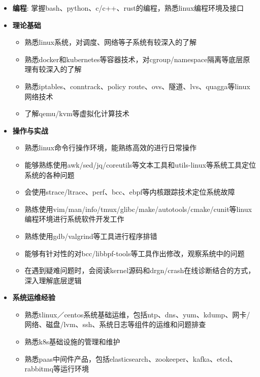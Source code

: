 \begin{itemize}[parsep=0.2ex]
  \item \textbf{编程}: 掌握bash、python、c/c++、rust的编程，熟悉linux编程环境及接口
  \item \textbf{理论基础}
    \begin{itemize}
      \item 熟悉linux系统，对调度、网络等子系统有较深入的了解
      \item 熟悉docker和kubernetes等容器技术，对cgroup/namespace隔离等底层原理有较深入的了解
      \item 熟悉iptables、conntrack、policy route、ovs、隧道、lvs、quagga等linux网络技术
      \item 了解qemu/kvm等虚拟化计算技术
    \end{itemize}
  \item \textbf{操作与实战}
    \begin{itemize}
      \item 熟悉linux命令行操作环境，能熟练高效的进行日常操作
      \item 能够熟练使用awk/sed/jq/coreutils等文本工具和utils-linux等系统工具定位系统的各种问题
      \item 会使用strace/ltrace、perf、bcc、ebpf等内核跟踪技术定位系统故障
      \item 熟练使用vim/man/info/tmux/glibc/make/autotools/cmake/cunit等linux编程环境进行系统软件开发工作
      \item 熟练使用gdb/valgrind等工具进行程序排错
      \item 能够有针对性的对bcc/libbpf-tools等工具作出修改，观察系统中的问题
      \item 在遇到疑难问题时，会阅读kernel源码和drgn/crash在线诊断结合的方式，深入理解底层逻辑
    \end{itemize}
  \item \textbf{系统运维经验}
    \begin{itemize}
      \item 熟悉tlinux／centos系统基础运维，包括ntp、dns、yum、kdump、网卡/网络、磁盘/lvm、ssh、系统日志等组件的运维和问题排查
      \item 熟悉k8s基础设施的管理和维护
      \item 熟悉paas中间件产品，包括elasticsearch、zookeeper、kafka、etcd、rabbitmq等运行环境
    \end{itemize}
\end{itemize}
